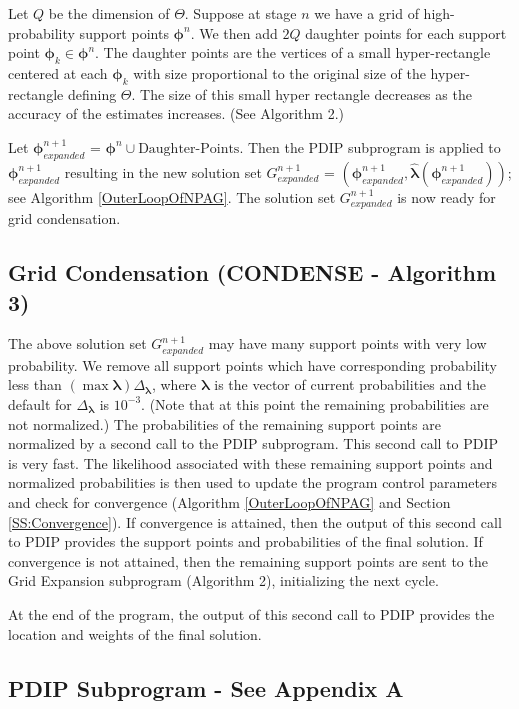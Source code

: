 Let $Q$ be the dimension of $\Theta$.  Suppose at stage $n$ we have a grid of high-probability support points 
$\bm{\phi}^n$. We then add $2Q$ daughter points for each support point   $\bm{\phi}_k \in \bm{\phi}^n$. 
The daughter points are the vertices of a small hyper-rectangle centered at each $\bm{\phi}_k$ with size proportional to the original size of the hyper-rectangle defining $\Theta$. The size of this small hyper rectangle decreases as the accuracy of the estimates increases. (See Algorithm 2.) 

Let $\bm{\phi}^{n+1}_{expanded}$ = $\bm{\phi}^n \cup \mbox{Daughter-Points}$.
Then the PDIP subprogram is applied to $\bm{\phi}^{n+1}_{expanded}$ resulting in the
new solution set $G^{n+1}_{expanded}$ =  $(\bm{\phi}^{n+1}_{expanded},\bm{\hat\lambda} (\bm  {\phi}^{n+1}_{expanded}  )  )$; 
see Algorithm \ref{OuterLoopOfNPAG}. The solution set $G^{n+1}_{expanded}$ is now ready for grid condensation.

\subsection{Grid Condensation (CONDENSE - Algorithm 3)}
The above solution set $G^{n+1}_{expanded}$   may have many support points with very low probability.
We remove all support points which have corresponding probability less than 
$(\max\bm{\lambda}) \Delta_{\bm{\lambda}}$, where $\bm{\lambda}$ is the vector of current probabilities and  the 
default for  $\Delta_{\bm{\lambda}}$  is $10^{-3}$.  (Note that at this point the remaining probabilities are not normalized.)
%
The probabilities of the remaining support points are normalized by a second call to the PDIP subprogram.
%
This second call to PDIP is very fast.
%
The likelihood associated with these remaining support points and normalized probabilities is then used to update the program control parameters and check for convergence (Algorithm \ref{OuterLoopOfNPAG} and Section \ref{SS:Convergence}).
If convergence is attained, then the output of this second call to PDIP provides the support points and probabilities of the final solution.
If convergence is not attained, then the remaining support points are sent to the Grid Expansion subprogram (Algorithm 2), initializing the next cycle.
%

At the end of the program, the output of this second call to PDIP provides the location and weights of the final solution.

\subsection{PDIP Subprogram - See Appendix A}
\label{SS:PDIP_subprogram}

